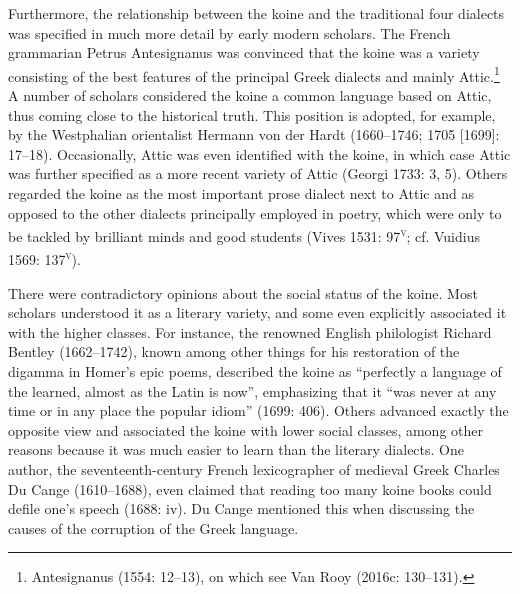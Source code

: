 \documentclass[12pt]{article}
\newenvironment{styleStandard}{\renewcommand\baselinestretch{1.25}\setlength\leftskip{0in}\setlength\rightskip{0in}\setlength\parindent{0.1972in}\setlength\parfillskip{0pt plus 1fil}\setlength\parskip{0in plus 1pt}\writerlistparindent\writerlistleftskip\leavevmode\normalfont\normalsize\writerlistlabel\ignorespaces}{\unskip\vspace{0in plus 1pt}\par}
\newcommand\writerlistleftskip{}
\newcommand\writerlistparindent{}
\newcommand\writerlistlabel{}
\begin{document}
\begin{styleStandard}
Furthermore, the relationship between the koine and the traditional four dialects was specified in much more detail by early modern scholars. The French grammarian Petrus Antesignanus was convinced that the koine was a variety consisting of the best features of the principal Greek dialects and mainly Attic.\footnote{ Antesignanus (1554: 12–13), on which see Van Rooy (2016c: 130–131).} A number of scholars considered the koine a common language based on Attic, thus coming close to the historical truth. This position is adopted, for example, by the Westphalian orientalist Hermann von der Hardt (1660–1746; 1705 [1699]: 17–18). Occasionally, Attic was even identified with the koine, in which case Attic was further specified as a more recent variety of Attic (Georgi 1733: 3, 5). Others regarded the koine as the most important prose dialect next to Attic and as opposed to the other dialects principally employed in poetry, which were only to be tackled by brilliant minds and good students (Vives 1531: 97\textsc{\textsuperscript{v}}; cf. Vuidius 1569: 137\textsc{\textsuperscript{v}}).
\end{styleStandard}

\begin{styleStandard}
There were contradictory opinions about the social status of the koine. Most scholars understood it as a literary variety, and some even explicitly associated it with the higher classes. For instance, the renowned English philologist Richard Bentley (1662–1742), known among other things for his restoration of the digamma in Homer’s epic poems, described the koine as “perfectly a language of the learned, almost as the Latin is now”, emphasizing that it “was never at any time or in any place the popular idiom” (1699: 406). Others advanced exactly the opposite view and associated the koine with lower social classes, among other reasons because it was much easier to learn than the literary dialects. One author, the seventeenth-century French lexicographer of medieval Greek Charles Du Cange (1610–1688), even claimed that reading too many koine books could defile one’s speech (1688: iv). Du Cange mentioned this when discussing the causes of the corruption of the Greek language.
\end{styleStandard}
\end{document}
